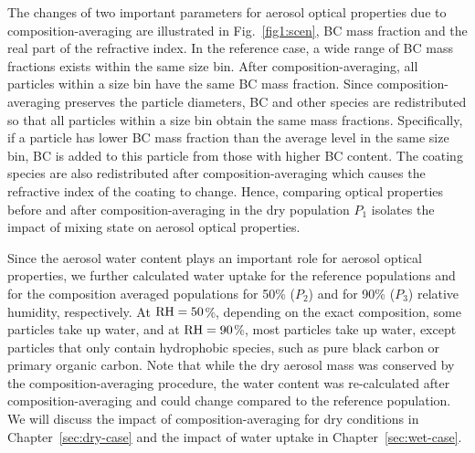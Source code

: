 \documentclass[edeposit,fullpage]{uiucthesis2009}
\begin{document}
The changes of two important parameters for aerosol optical properties
due to composition-averaging are illustrated in Fig.~\ref{fig1:scen},
BC mass fraction and the real part of the refractive index. In the
reference case, a wide range of BC mass fractions exists within the
same size bin. After composition-averaging, all particles within a
size bin have the same BC mass fraction.  Since composition-averaging
preserves the particle diameters, BC and other species are
redistributed so that all particles within a size bin obtain the same
mass fractions. Specifically, if a particle has lower BC mass fraction
than the average level in the same size bin, BC is added to this
particle from those with higher BC content. The coating species are
also redistributed after composition-averaging which causes the
refractive index of the coating to change. Hence, comparing optical
properties before and after composition-averaging in the dry
population $P_1$ isolates the impact of mixing state on aerosol
optical properties.


Since the aerosol water content plays an important role for aerosol
optical properties, we further calculated water uptake for the
reference populations and for the composition averaged populations for
50\% ($P_2$) and for 90\% ($P_3$) relative humidity, respectively.  At
$\rm RH = 50$\%, depending on the exact composition, some particles
take up water, and at $\rm RH = 90$\%, most particles take up water,
except particles that only contain hydrophobic species, such as pure
black carbon or primary organic carbon. Note that while the dry
aerosol mass was conserved by the composition-averaging procedure, the
water content was re-calculated after composition-averaging and could
change compared to the reference population. We will discuss the
impact of composition-averaging for dry conditions in
Chapter~\ref{sec:dry-case} and the impact of water uptake in
Chapter~\ref{sec:wet-case}.
\end{document}
